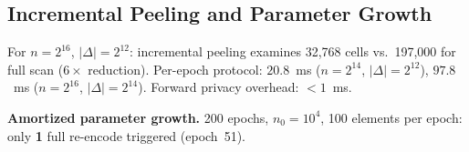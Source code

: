 \subsection{Incremental Peeling and Parameter Growth}

For $n = 2^{16}$, $|\Delta| = 2^{12}$: incremental peeling examines 32,768
cells vs.\ 197,000 for full scan ($6\times$ reduction). Per-epoch protocol:
$20.8$~ms ($n = 2^{14}$, $|\Delta| = 2^{12}$), $97.8$~ms ($n = 2^{16}$,
$|\Delta| = 2^{14}$). Forward privacy overhead: $<1$~ms.

\textbf{Amortized parameter growth.} 200 epochs, $n_0 = 10^4$, 100 elements
per epoch: only \textbf{1} full re-encode triggered (epoch~51).

